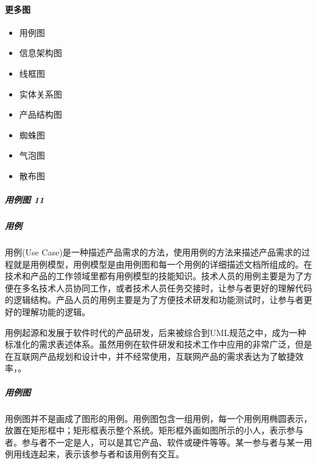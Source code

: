 \documentclass[letterpaper,10pt,english]{sphinxmanual}
\begin{document}
\paragraph{更多图}
\label{\detokenize{chapter_knowledge/flow_chart:id26}}\begin{itemize}
\item {} 
用例图

\item {} 
信息架构图

\item {} 
线框图

\item {} 
实体关系图%
\begin{footnote}[593]\sphinxAtStartFootnote
{}
%
\end{footnote}

\item {} 
产品结构图

\item {} 
蜘蛛图

\item {} 
气泡图

\item {} 
散布图

\end{itemize}


\subparagraph{用例图 11\sphinxfootnotemark[594]}
\label{\detokenize{chapter_knowledge/flow_chart:id27}}%
\begin{footnotetext}[594]\sphinxAtStartFootnote
{}
%
\end{footnotetext}\ignorespaces 

\subparagraph{用例}
\label{\detokenize{chapter_knowledge/flow_chart:id28}}
用例(Use
Case)是一种描述产品需求的方法，使用用例的方法来描述产品需求的过程就是用例模型，用例模型是由用例图和每一个用例的详细描述文档所组成的。在技术和产品的工作领域里都有用例模型的技能知识。技术人员的用例主要是为了方便在多名技术人员协同工作，或者技术人员任务交接时，让参与者更好的理解代码的逻辑结构。产品人员的用例主要是为了方便技术研发和功能测试时，让参与者更好的理解功能的逻辑。

用例起源和发展于软件时代的产品研发，后来被综合到UML规范之中，成为一种标准化的需求表述体系。虽然用例在软件研发和技术工作中应用的非常广泛，但是在互联网产品规划和设计中，并不经常使用，互联网产品的需求表达为了敏捷效率，。


\subparagraph{用例图}
\label{\detokenize{chapter_knowledge/flow_chart:id29}}
用例图并不是画成了图形的用例。用例图包含一组用例，每一个用例用椭圆表示，放置在矩形框中；矩形框表示整个系统。矩形框外画如图所示的小人，表示参与者。参与者不一定是人，可以是其它产品、软件或硬件等等。某一参与者与某一用例用线连起来，表示该参与者和该用例有交互。
\end{document}
